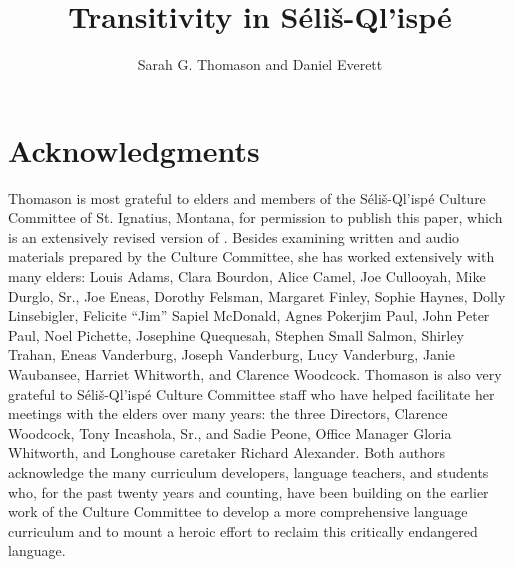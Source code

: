 \documentclass[output=paper,colorlinks,citecolor=brown]{langscibook}
\title{Transitivity in Séliš-Ql’ispé}
\author{Sarah G. Thomason\affiliation{University of Michigan} and
       Daniel Everett\affiliation{Bentley University}}
\begin{document}
\maketitle




\section*{Acknowledgments}

Thomason is most
   grateful to elders and members of the S\'eli\v{s}-Ql'isp\'e
   Culture Committee of St. Ignatius, Montana, for permission to
   publish this paper, which is an extensively revised version of
   \cite{S.Thomason&Everett:1993}.  Besides examining written and
   audio materials prepared by the Culture Committee, she has worked
   extensively with many elders: {\dag}Louis Adams, {\dag}Clara
   Bourdon, {\dag}Alice Camel, {\dag}Joe Cullooyah, {\dag}Mike
   Durglo, Sr., {\dag}Joe Eneas, {\dag}Dorothy Felsman,
   {\dag}Margaret Finley, Sophie Haynes, {\dag}Dolly Linsebigler,
   {\dag}Felicite ``Jim'' Sapiel McDonald, {\dag}Agnes Pokerjim Paul,
   {\dag}John Peter Paul, {\dag}Noel Pichette, {\dag}Josephine
   Quequesah, Stephen Small Salmon, Shirley Trahan, {\dag}Eneas
   Vanderburg, {\dag}Joseph Vanderburg, Lucy Vanderburg, {\dag}Janie
   Waubansee, {\dag}Harriet Whitworth, and {\dag}Clarence Woodcock.
   Thomason is also very grateful to S\'eli\v{s}-Ql'isp\'e Culture
   Committee staff who have helped facilitate her meetings with the
   elders over many years: the three Directors, {\dag}Clarence
 Woodcock, {\dag}Tony Incashola, Sr., and Sadie Peone, Office Manager
 {\dag}Gloria Whitworth, and Longhouse caretaker Richard Alexander.
 Both authors acknowledge the many curriculum developers, language
 teachers, and students who, for the past twenty years and counting,
 have been building on the earlier work of the Culture Committee to
 develop a more comprehensive language curriculum and to mount a
 heroic effort to reclaim this critically endangered language.
\end{document}
